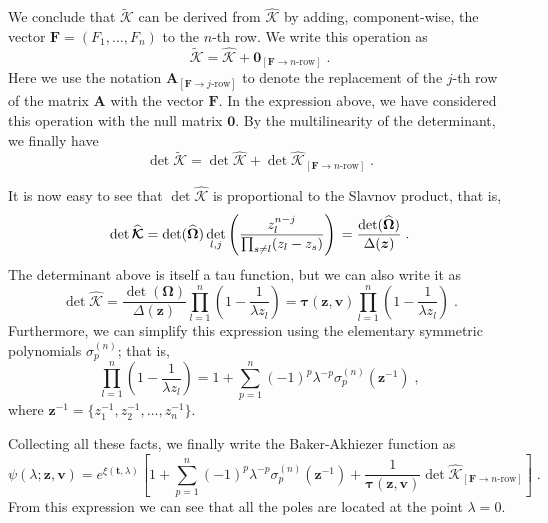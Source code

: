 \documentclass[a4paper,11pt]{amsart}
\begin{document}
We conclude that \(\widetilde{\bm{\mathcal{K}}}\) can be derived from
\(\widehat{\bm{\mathcal{K}}}\) by adding, component-wise, the vector
\(\bm{F} = (F_1, \dots , F_n)\) to the \(n\)-th row.  We write this
operation as
\begin{equation}
  \widetilde{\bm{\mathcal{K}}} = \widehat{\bm{\mathcal{K}}} + \bm{0}_{[ \bm{F} \to n\text{-row}]}\; . 
\end{equation}
Here we use the notation \(\mathcal{\bm{A}}_{[ \bm{F} \to j\text{-row}]}\) 
to denote the replacement of the \(j\)-th row of the matrix 
\(\mathcal{\bm{A}}\) with the vector \(\bm{F}\). In the expression above, 
we have considered this operation with the null matrix \(\bm{0}\).
By the multilinearity of the determinant, we finally have
\begin{equation}
  \det \widetilde{\bm{\mathcal{K}}} = 
    \det \widehat{\bm{\mathcal{K}}} + 
    \det \widehat{\bm{\mathcal{K}}}_{[\bm{F} \to n\text{-row}]}\; .
\end{equation}

It is now easy to see that \(\det \widehat{\bm{\mathcal{K}}}\) is
proportional to the Slavnov product, that is,
\begin{equation}
    \det \widehat{\bm{\mathcal{K}}}  = 
    \det(\widehat{\bm{\Omega}})
    \det_{l,j}
    \left( \frac{z_l^{n-j}}{\prod_{s\neq l} (z_l - z_s)} \right)\\
    = \frac{\det(\widehat{\bm{\Omega}})}{\Delta(\bm{z})}\;. 
\end{equation}
The determinant above is itself a tau function, but we can also write
it as
\begin{equation}
    \det \widehat{\bm{\mathcal{K}}} = 
    \frac{\det(\bm{\Omega})}{\Delta(\bm{z})}
    \prod_{l=1}^n \left( 1 - \frac{1}{\lambda z_l} \right) 
    = \bm{\tau}(\bm{z}, \bm{v}) \prod_{l=1}^n \left( 1 - \frac{1}{\lambda z_l} \right) \; . 
\end{equation}
Furthermore, we can simplify this expression using the elementary
symmetric polynomials \(\sigma_p^{(n)}\); that is,
\begin{equation}
  \prod_{l=1}^n \left( 1 - \frac{1}{\lambda z_l} \right) = 1 + 
  \sum_{p=1}^n (-1)^p \lambda^{-p} \sigma_p^{(n)}(\bm{z}^{-1})\; , 
\end{equation}
where \( \bm{z}^{-1} = \{z_1^{-1}, z_2^{-1}, \dots , z_n^{-1}\}\). 

Collecting all these facts, we finally write the Baker-Akhiezer
function as
\begin{equation}
  \psi(\lambda; \bm{z}, \bm{v}) =
  e^{\xi(\bm{t}, \lambda)}  \left[ 1 + 
  \sum_{p=1}^n (-1)^p \lambda^{-p} \sigma_p^{(n)}(\bm{z}^{-1})
    + \frac{1}{\bm{\tau}(\bm{z}, \bm{v})}
    \det \widehat{\bm{\mathcal{K}}}_{[\bm{F} \to n\text{-row}]}
  \right]\; .
\end{equation}
From this expression we can see that all the poles are located at the
point \(\lambda = 0\).
\end{document}
